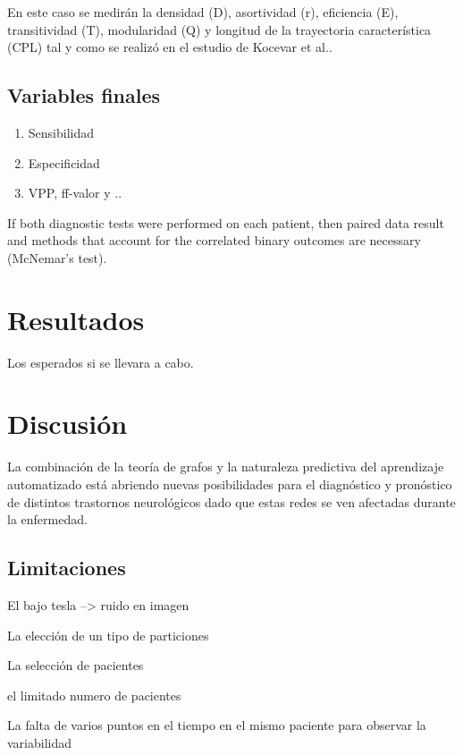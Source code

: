 \documentclass[fleqn,12pt]{UICArticle} %
\begin{document}
En este caso se medirán la densidad (D), asortividad (r), eficiencia (E), transitividad (T), modularidad (Q) y longitud de la trayectoria característica (CPL) tal y como se realizó en el estudio de Kocevar et al.\cite{Kocevar2016}.

\subsection{Variables finales}


\begin{enumerate}[noitemsep]
\item Sensibilidad
\item Especificidad
\item VPP, ff-valor y ..
\end{enumerate}

If both diagnostic tests were performed on each patient, then paired data result and methods that account for the correlated binary outcomes are necessary (McNemar's test).


\section{Resultados}
Los esperados si se llevara a cabo.

\section{Discusión}

La combinación de la teoría de grafos y la naturaleza predictiva del aprendizaje automatizado está abriendo nuevas posibilidades para el diagnóstico y pronóstico de distintos trastornos neurológicos dado que estas redes se ven afectadas durante la enfermedad. 


\subsection{Limitaciones}

\begin{list}{-}
\item El bajo tesla --> ruido en imagen
\item La elección de un tipo de particiones
\item La selección de pacientes
\item el limitado numero de pacientes
\item La falta de varios puntos en el tiempo en el mismo paciente para observar la variabilidad
\end{list}
\end{document}
